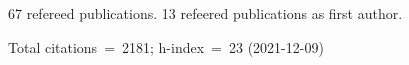 67 refereed publications. 13 refeered publications as first author.

Total citations~=~2181; h-index~=~23 (2021-12-09)